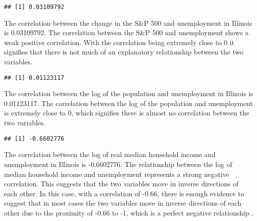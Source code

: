 \documentclass[
]{article}
\newenvironment{Shaded}{\begin{snugshade}}{\end{snugshade}}
\newcommand{\KeywordTok}[1]{\textcolor[rgb]{0.13,0.29,0.53}{\textbf{#1}}}
\newcommand{\NormalTok}[1]{#1}
\newcommand{\OperatorTok}[1]{\textcolor[rgb]{0.81,0.36,0.00}{\textbf{#1}}}
\begin{document}
\begin{Shaded}
\end{Shaded}

\begin{verbatim}
## [1] 0.03109792
\end{verbatim}

The correlation between the change in the S\&P 500 and unemployment in
Illinois is 0.03109792. The correlation between the S\&P 500 and
unemployment shows a weak positive correlation. With the correlation
being extremely close to 0 it signifies that there is not much of an
explanatory relationship between the two variables.

\begin{Shaded}
\end{Shaded}

\begin{verbatim}
## [1] 0.01123117
\end{verbatim}

The correlation between the log of the population and unemployment in
Illinois is 0.01123117. The correlation between the log of the
population and unemployment is extremely close to 0, which signifies
there is almost no correlation between the two variables.

\begin{Shaded}
\end{Shaded}

\begin{verbatim}
## [1] -0.6602776
\end{verbatim}

The correlation between the log of real median household income and
unemployment in Illinois is -0.6602776. The relationship between the log
of median household income and unemployment represents a strong negative
correlation. This suggests that the two variables move in inverse
directions of each other. In this case, with a correlation of -0.66,
there is enough evidence to suggest that in most cases the two variables
move in inverse directions of each other due to the proximity of -0.66
to -1, which is a perfect negative relationship .
\end{document}
